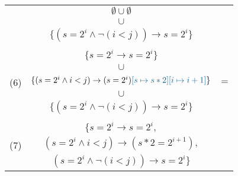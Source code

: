 \documentclass[11pt]{article}
\newcommand{\hblue}[1]{{\color{MidnightBlue}{#1}}}
\begin{document}
\begin{tabular}{lcl}
  & $\emptyset \cup \emptyset$ \\
  & \multicolumn{1}{c}{$\cup$} \\
  & $\{(s = 2^i \land \neg(i < j)) \to s = 2^i\}$ \\[2ex]\hline\\
  \multirow{5}{*}{(6)} & $\{s = 2^i \to s = 2^i\}$ \\
  & \multicolumn{1}{c}{$\cup$} \\
  & $\{(s = 2^i \land i < j) \to (s = 2^i)\hblue{[s \mapsto s*2][i \mapsto i + 1]}\}$ & =\\
  & \multicolumn{1}{c}{$\cup$} \\
  & $\{(s = 2^i \land \neg(i < j)) \to s = 2^i\}$ \\[2ex]\hline\\
  \multirow{5}{*}{(7)} & $\{s = 2^i \to s = 2^i,$ \\
  & $(s = 2^i \land i < j) \to (s*2 = 2^{i+1}),$  \\
  & $(s = 2^i \land \neg(i < j)) \to s = 2^i\}$

\end{tabular}
\end{document}
